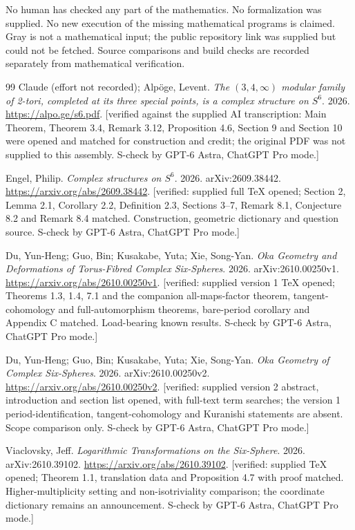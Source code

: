 \documentclass[11pt,a4paper]{article}
\theoremstyle{plain}
\theoremstyle{definition}
\begin{document}
No human has checked any part of the mathematics. No formalization was supplied. No new execution of the missing mathematical programs is claimed. Gray is not a mathematical input; the public repository link was supplied but could not be fetched. Source comparisons and build checks are recorded separately from mathematical verification.

\begin{thebibliography}{99}
{Claude (effort not recorded)}; Alp{\"o}ge, Levent. \emph{The $(3,4,\infty)$ modular family of 2-tori, completed at its three special points, is a complex structure on $S^6$}. 2026. \url{https://alpo.ge/s6.pdf}. [verified against the supplied AI transcription: Main Theorem, Theorem 3.4, Remark 3.12, Proposition 4.6, Section 9 and Section 10 were opened and matched for construction and credit; the original PDF was not supplied to this assembly. S-check by GPT-6 Astra, ChatGPT Pro mode.]

Engel, Philip. \emph{Complex structures on $S^6$}. 2026. arXiv:2609.38442. \url{https://arxiv.org/abs/2609.38442}. [verified: supplied full TeX opened; Section 2, Lemma 2.1, Corollary 2.2, Definition 2.3, Sections 3--7, Remark 8.1, Conjecture 8.2 and Remark 8.4 matched. Construction, geometric dictionary and question source. S-check by GPT-6 Astra, ChatGPT Pro mode.]

Du, Yun-Heng; Guo, Bin; Kusakabe, Yuta; Xie, Song-Yan. \emph{Oka Geometry and Deformations of Torus-Fibred Complex Six-Spheres}. 2026. arXiv:2610.00250v1. \url{https://arxiv.org/abs/2610.00250v1}. [verified: supplied version 1 TeX opened; Theorems 1.3, 1.4, 7.1 and the companion all-maps-factor theorem, tangent-cohomology and full-automorphism theorems, bare-period corollary and Appendix C matched. Load-bearing known results. S-check by GPT-6 Astra, ChatGPT Pro mode.]

Du, Yun-Heng; Guo, Bin; Kusakabe, Yuta; Xie, Song-Yan. \emph{Oka Geometry of Complex Six-Spheres}. 2026. arXiv:2610.00250v2. \url{https://arxiv.org/abs/2610.00250v2}. [verified: supplied version 2 abstract, introduction and section list opened, with full-text term searches; the version 1 period-identification, tangent-cohomology and Kuranishi statements are absent. Scope comparison only. S-check by GPT-6 Astra, ChatGPT Pro mode.]

Viaclovsky, Jeff. \emph{Logarithmic Transformations on the Six-Sphere}. 2026. arXiv:2610.39102. \url{https://arxiv.org/abs/2610.39102}. [verified: supplied TeX opened; Theorem 1.1, translation data and Proposition 4.7 with proof matched. Higher-multiplicity setting and non-isotriviality comparison; the coordinate dictionary remains an announcement. S-check by GPT-6 Astra, ChatGPT Pro mode.]


\end{thebibliography}
\end{document}
